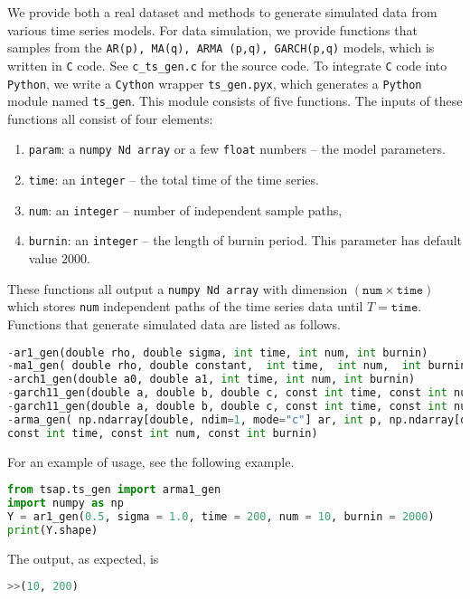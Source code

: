 We provide both a real dataset and methods to generate simulated data from various time series models.  For data simulation,  we provide functions that samples from the \texttt{AR(p), MA(q), ARMA (p,q), GARCH(p,q)} models, which is written in \texttt{C} code. See \texttt{c\_ts\_gen.c} for the source code. To integrate \texttt{C} code into \texttt{Python}, we write a \texttt{Cython} wrapper \texttt{ts\_gen.pyx}, which generates a \texttt{Python} module named \texttt{ts\_gen}. This module consists of five functions.  The inputs of these functions all consist  of four  elements: 
\begin{enumerate}
\item  \texttt{param}: a \texttt{numpy Nd array} or a few \texttt{float} numbers -- the model parameters.
\item \texttt{time}:  an  \texttt{integer} -- the total time of the time series.
\item  \texttt{num}: an  \texttt{integer} -- number of independent sample paths, 
\item \texttt{burnin}: an  \texttt{integer} -- the length of burnin period. This parameter has default value $2000$. 
\end{enumerate} 
These functions all output a \texttt{numpy Nd array} with dimension $( \texttt{num} \times \texttt{time})$ which stores  \texttt{num} independent paths of the time series data until $T = \texttt{time}$. Functions that generate simulated data are listed as follows. 
 
  \begin{lstlisting}[language=Python]
-ar1_gen(double rho, double sigma, int time, int num, int burnin)
-ma1_gen( double rho, double constant,  int time,  int num,  int burnin 
-arch1_gen(double a0, double a1, int time, int num, int burnin)
-garch11_gen(double a, double b, double c, const int time, const int num, const int burnin 
-garch11_gen(double a, double b, double c, const int time, const int num, const int burnin )
-arma_gen( np.ndarray[double, ndim=1, mode="c"] ar, int p, np.ndarray[double, ndim=1, mode="c"]  ma, const int q, const double sigma,
const int time, const int num, const int burnin)
\end{lstlisting}
For an example of usage, see the following example. 
   \begin{lstlisting}[language=Python]
from tsap.ts_gen import arma1_gen
import numpy as np
Y = ar1_gen(0.5, sigma = 1.0, time = 200, num = 10, burnin = 2000)
print(Y.shape)
\end{lstlisting}
The output, as expected, is
   \begin{lstlisting}[language=Python]
>>(10, 200)
\end{lstlisting}